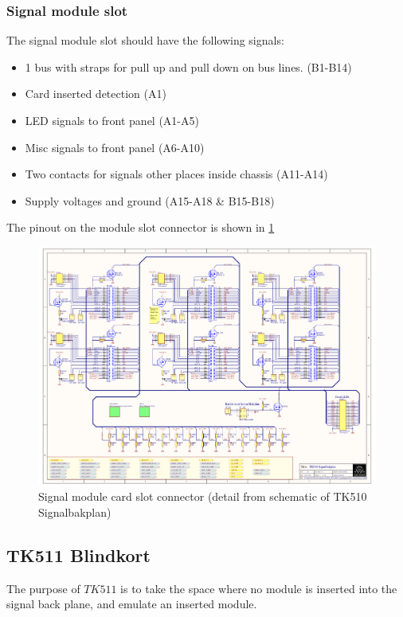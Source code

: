 \subsubsection*{Signal module slot}
The signal module slot should have the following signals:
\begin{itemize}
    \item 1 bus with straps for pull up and pull down on bus lines. (B1-B14)
    \item Card inserted detection (A1)
    \item LED signals to front panel (A1-A5)
    \item Misc signals to front panel (A6-A10)
    \item Two contacts for signals other places inside chassis (A11-A14)
    \item Supply voltages and ground (A15-A18 \& B15-B18)
\end{itemize}
The pinout on the module slot connector is shown in \cref{fig:signalmodulslot}

\begin{figure}[h]
    \centering
    \includegraphics[trim={4.1cm 14.3cm 21.2cm 3.3cm},clip,width=\textwidth]{img/TK510_Signalbakplan.pdf}
    \caption{Signal module card slot connector (detail from schematic of TK510 Signalbakplan)}
    \label{fig:signalmodulslot}
\end{figure}

\subsection*{TK511 Blindkort}
The purpose of $TK511$ is to take the space where no module is inserted into the signal back plane, and emulate an inserted module.


